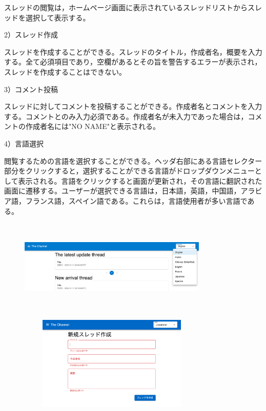 \documentclass[b5paper,12pt]{jsreport}
\begin{document}
スレッドの閲覧は，ホームページ画面に表示されているスレッドリストからスレッドを選択して表示する。

2）スレッド作成

スレッドを作成することができる。スレッドのタイトル，作成者名，概要を入力する。全て必須項目であり，空欄があるとその旨を警告するエラーが表示され，スレッドを作成することはできない。

3）コメント投稿

スレッドに対してコメントを投稿することができる。作成者名とコメントを入力する。コメントとのみ入力必須である。作成者名が未入力であった場合は，コメントの作成者名には"NO NAME"と表示される。

4）言語選択

閲覧するための言語を選択することができる。ヘッダ右部にある言語セレクター部分をクリックすると，選択することができる言語がドロップダウンメニューとして表示される。言語をクリックすると画面が更新され，その言語に翻訳された画面に遷移する。ユーザーが選択できる言語は，日本語，英語，中国語，アラビア語，フランス語，スペイン語である。これらは，言語使用者が多い言語である。

\begin{figure}[htbp]
	\centering
	\includegraphics[width=90mm,height=45mm]{./img/select_language.png}

\end{figure}

\begin{figure}[htbp]
	\centering
	\includegraphics[width=90mm, height=45mm]{./img/thread_create_error.png}
\end{figure}
\end{document}
